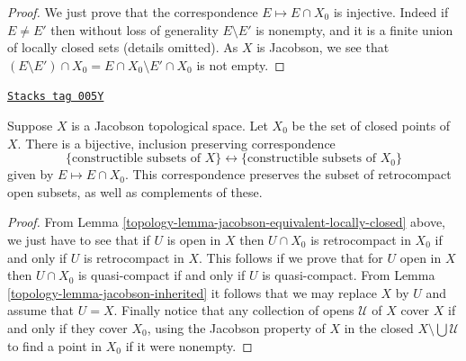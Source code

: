 \begin{proof}
We just prove that the correspondence $E \mapsto E \cap X_0$ is injective.
Indeed if $E\neq E'$ then without loss of generality $E\setminus E'$ is
nonempty, and it is a finite union of locally closed sets (details omitted).
As $X$ is Jacobson, we see that
$(E \setminus E') \cap X_0 = E \cap X_0 \setminus E' \cap X_0$ is not empty.
\end{proof}

\begin{lemma}
\label{topology-lemma-jacobson-equivalent-constructible}
\href{https://stacks.math.columbia.edu/tag/005Y}{\texttt{Stacks tag 005Y}}

Suppose $X$ is a Jacobson topological space.
Let $X_0$ be the set of closed points of $X$.
There is a bijective, inclusion preserving correspondence
$$
\{\text{constructible subsets of } X\}
\leftrightarrow
\{\text{constructible subsets of } X_0\}
$$
given by $E \mapsto E \cap X_0$. This correspondence preserves
the subset of retrocompact open subsets, as well as complements
of these.
\end{lemma}

\begin{proof}

From  Lemma \ref{topology-lemma-jacobson-equivalent-locally-closed} above,
we just have to see that if $U$ is open in $X$ then $U\cap X_0$ is
retrocompact in $X_0$ if and only if $U$ is retrocompact in $X$.
This follows if we prove that for $U$ open in $X$ then $U\cap X_0$ is
quasi-compact if and only if $U$ is quasi-compact.
From  Lemma \ref{topology-lemma-jacobson-inherited} it follows that we may replace
$X$ by $U$ and assume that $U = X$.
Finally notice that any collection of opens $\mathcal{U}$ of $X$ cover
$X$ if and only if they cover $X_0$, using the Jacobson property
of $X$ in the closed $X\setminus \bigcup \mathcal{U}$ to find a point
in $X_0$ if it were nonempty.
\end{proof}

